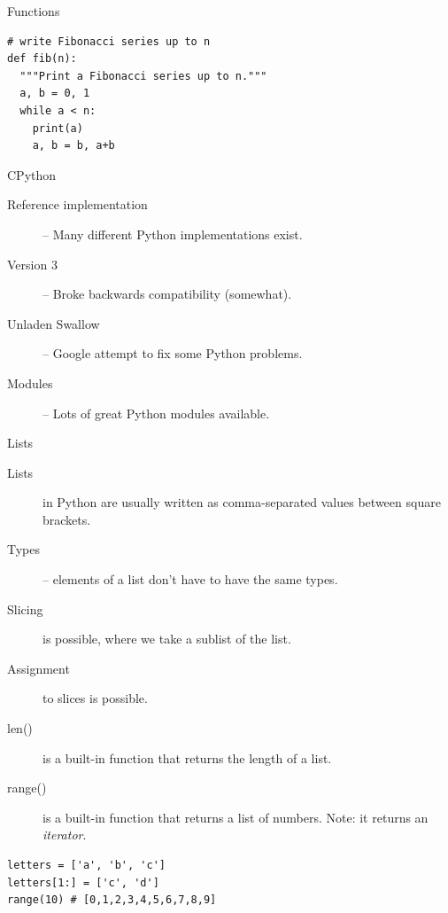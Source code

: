 \begin{frame}[fragile]{Functions}
  \begin{verbatim}
# write Fibonacci series up to n
def fib(n):   
  """Print a Fibonacci series up to n."""
  a, b = 0, 1
  while a < n:
    print(a)
    a, b = b, a+b
  \end{verbatim}
\end{frame}

\begin{frame}{CPython}
  \begin{description}
    \item[Reference implementation] -- Many different Python implementations exist.
    \vspace{0.25cm}
    \item[Version 3] -- Broke backwards compatibility (somewhat).
    \vspace{0.25cm}
    \item[Unladen Swallow] -- Google attempt to fix some Python problems.
    \vspace{0.25cm}
    \item[Modules] -- Lots of great Python modules available.
  \end{description}
\end{frame}

\begin{frame}[fragile]{Lists}
	\begin{description}
		\item[Lists] in Python are usually written as comma-separated values between square brackets.
		\item[Types] -- elements of a list don't have to have the same types.
		\item[Slicing] is possible, where we take a sublist of the list.
		\item[Assignment] to slices is possible.
		\item[len()] is a built-in function that returns the length of a list.
		\item[range()] is a built-in function that returns a list of numbers. Note: it returns an \emph{iterator}.
	\end{description}
	\begin{verbatim}
letters = ['a', 'b', 'c']
letters[1:] = ['c', 'd']
range(10) # [0,1,2,3,4,5,6,7,8,9]
  \end{verbatim}
\end{frame}

